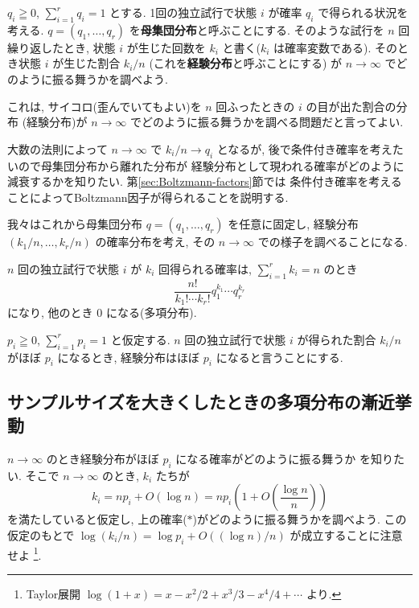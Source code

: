 \documentclass[12pt,twoside]{jarticle}
\theoremstyle{definition} %
\theoremstyle{definition} %
\theoremstyle{definition} %
\numberwithin{theorem}{section}
\numberwithin{equation}{section}
\numberwithin{figure}{section}
\numberwithin{table}{section}
\newcommand\secref[1]{第\ref{#1}節}
\begin{document}
$q_i\geqq 0$, $\sum_{i=1}^r q_i=1$ とする.
1回の独立試行で状態 $i$ が確率 $q_i$ で得られる状況を考える.
$q=(q_1,\ldots,q_r)$ を{\bf 母集団分布}と呼ぶことにする.
そのような試行を $n$ 回繰り返したとき, 
状態 $i$ が生じた回数を $k_i$ と書く($k_i$ は確率変数である).
そのとき状態 $i$ が生じた割合 $k_i/n$ (これを{\bf 経験分布}と呼ぶことにする)
が $n\to\infty$ でどのように振る舞うかを調べよう.

これは, サイコロ(歪んでいてもよい)を $n$ 回ふったときの $i$ の目が出た割合の分布
(経験分布)が $n\to\infty$ でどのように振る舞うかを調べる問題だと言ってよい.

大数の法則によって $n\to\infty$ で $k_i/n\to q_i$ となるが,
後で条件付き確率を考えたいので母集団分布から離れた分布が
経験分布として現われる確率がどのように減衰するかを知りたい.
\secref{sec:Boltzmann-factors}では
条件付き確率を考えることによってBoltzmann因子が得られることを説明する.

我々はこれから母集団分布 $q=(q_1,\ldots,q_r)$ を任意に固定し, 
経験分布 $(k_1/n,\ldots,k_r/n)$ の確率分布を考え,
その $n\to\infty$ での様子を調べることになる.

$n$ 回の独立試行で状態 $i$ が $k_i$ 回得られる確率は, 
$\sum_{i=1}^r k_i=n$ のとき
\[
\frac{n!}{k_1!\cdots k_r!} q_1^{k_1}\cdots q_r^{k_r}
\tag{$*$}
\]
になり, 他のとき $0$ になる(多項分布).

$p_i\geqq 0$, $\sum_{i=1}^r p_i=1$ と仮定する.
$n$ 回の独立試行で状態 $i$ が得られた割合 $k_i/n$ がほぼ $p_i$ になるとき, 
経験分布はほぼ $p_i$ になると言うことにする.


\subsection{サンプルサイズを大きくしたときの多項分布の漸近挙動}
\label{sec:log}

$n\to\infty$ のとき経験分布がほぼ $p_i$ になる確率がどのように振る舞うか
を知りたい. そこで $n\to\infty$ のとき, $k_i$ たちが
\[
k_i= np_i+O(\log n) = np_i\left(1 + O\left(\frac{\log n}{n}\right)\right) 
\tag{$**$}
\]
を満たしていると仮定し, 上の確率($*$)がどのように振る舞うかを調べよう.
この仮定のもとで $\log(k_i/n)=\log p_i+O((\log n)/n)$ が成立することに注意せよ%
\footnote{Taylor展開 $\log(1+x)=x-x^2/2+x^3/3-x^4/4+\cdots$ より.}.
\end{document}

